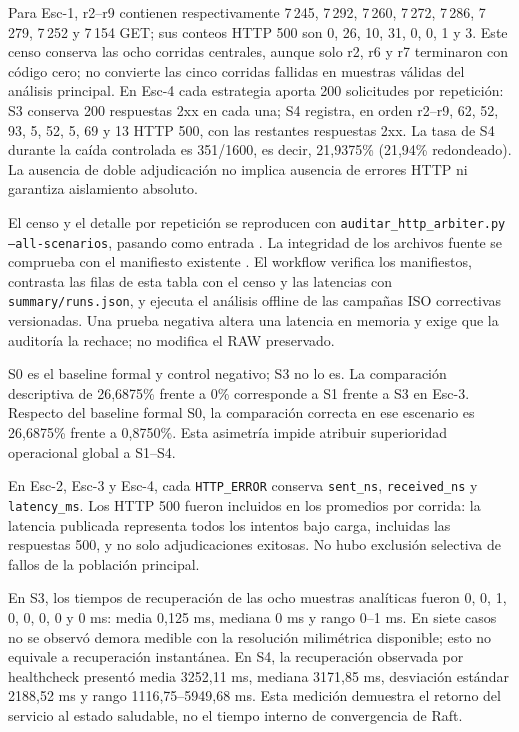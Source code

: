 Para Esc-1, r2--r9 contienen respectivamente 7\,245, 7\,292, 7\,260,
7\,272, 7\,286, 7\,279, 7\,252 y 7\,154 GET; sus conteos HTTP 500 son
0, 26, 10, 31, 0, 0, 1 y 3. Este censo conserva las ocho corridas centrales,
aunque solo r2, r6 y r7 terminaron con código cero; no convierte las cinco
corridas fallidas en muestras válidas del análisis principal.
En Esc-4 cada estrategia aporta 200 solicitudes por repetición: S3 conserva
200 respuestas 2xx en cada una; S4 registra, en orden r2--r9, 62, 52, 93, 5,
52, 5, 69 y 13 HTTP 500, con las restantes respuestas 2xx. La tasa de S4
durante la caída controlada es 351/1600, es decir, 21,9375\% (21,94\%
redondeado). La ausencia de doble adjudicación no implica ausencia de errores
HTTP ni garantiza aislamiento absoluto.

El censo y el detalle por repetición se reproducen con
\texttt{auditar\_http\_arbiter.py --all-scenarios}, pasando como entrada
. La integridad de los
archivos fuente se comprueba con el manifiesto existente
.
El workflow  verifica los manifiestos,
contrasta las filas de esta tabla con el censo y las latencias con
\texttt{summary/runs.json}, y ejecuta el análisis offline de las campañas ISO
correctivas versionadas. Una prueba negativa altera una latencia en memoria
y exige que la auditoría la rechace; no modifica el RAW preservado.

S0 es el baseline formal y control negativo; S3 no lo es. La comparación
descriptiva de 26,6875\% frente a 0\% corresponde a S1 frente a S3 en Esc-3.
Respecto del baseline formal S0, la comparación correcta en ese escenario es
26,6875\% frente a 0,8750\%. Esta asimetría impide atribuir superioridad
operacional global a S1--S4.

En Esc-2, Esc-3 y Esc-4, cada \texttt{HTTP\_ERROR} conserva \texttt{sent\_ns}, \texttt{received\_ns} y
\texttt{latency\_ms}. Los HTTP 500 fueron incluidos en los promedios por corrida:
la latencia publicada representa todos los intentos bajo carga, incluidas las
respuestas 500, y no solo adjudicaciones exitosas. No hubo exclusión selectiva
de fallos de la población principal.

En S3, los tiempos de recuperación de las ocho muestras analíticas fueron 0,
0, 1, 0, 0, 0, 0 y 0 ms: media 0,125 ms, mediana 0 ms y rango 0--1 ms. En siete
casos no se observó demora medible con la resolución milimétrica disponible;
esto no equivale a recuperación instantánea. En S4, la recuperación observada
por healthcheck presentó media 3252,11 ms, mediana 3171,85 ms, desviación
estándar 2188,52 ms y rango 1116,75--5949,68 ms. Esta medición demuestra el
retorno del servicio al estado saludable, no el tiempo interno de convergencia
de Raft.

